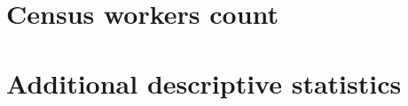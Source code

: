 \documentclass[12pt]{article}
\begin{document}
\section{Census workers count} \label{workers_appendix_section}

\begin{table}[H] 
    \caption{Census worker counts}
    \label{workers_appendix}
    \centering
    \small
    
\end{table}


%     

\section{Additional descriptive statistics}
\label{app:descriptive_figs}
\end{document}
